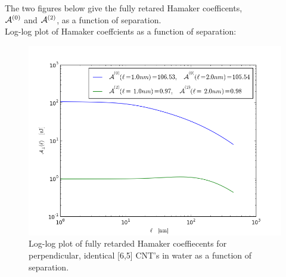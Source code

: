 \documentclass[a4paper]{article}
\begin{document}
\begin{center}
\hskip 73pt
The two figures below give the fully retared Hamaker coefficents,\\ 
${\cal A}^{(0)}$ and ${\cal A}^{(2)}$, as a function of separation.\\
\hskip 73pt
Log-log plot of Hamaker coeffcients as a function of separation:
\begin{figure}[t!]
\begin{center}
\includegraphics[width=1.2\textwidth]{plots/140322_65w65_HCs_perpendicular_ret.png}
\hskip 43pt
\caption{Log-log plot of fully retarded Hamaker coeffiecents for perpendicular, identical [6,5] CNT's in water
as a function of separation.} 
\label{eiz65}
\end{center}
\end{figure} 


\end{center}
\end{document}
